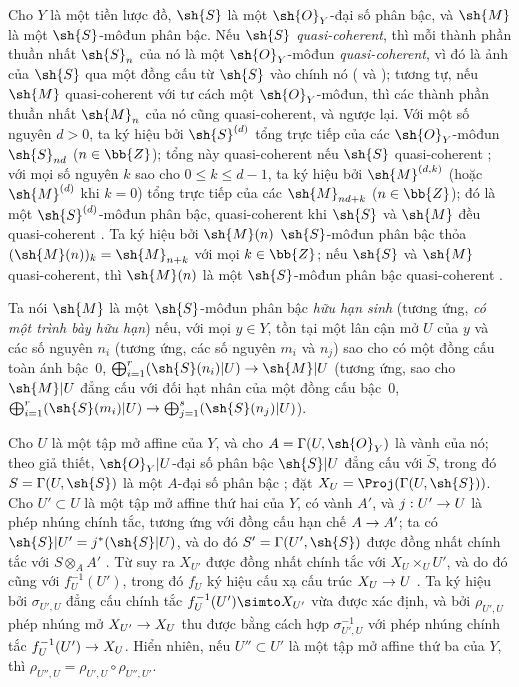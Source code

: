 \documentclass[oneside,10pt]{amsart}
\makeatletter
\renewcommand{\leq}{\leqslant}
\newcommand{\ega@arrow}[2]{\mathchoice{#1}{#2}{#2}{#2}}
\renewcommand{\to}{\ega@arrow{\longrightarrow}{\rightarrow}}
\newcommand{\oldpage}[2][]{\marginnote{\normalfont\footnotesize\textbf{#1}~|~#2}\ignorespaces}
\let\EGAOriginalLabel\label
\renewcommand{\label}[1]{\phantomsection\EGAOriginalLabel{#1}}
\makeatother
\begin{document}
\begin{env}[3.1.1]
\label{II.3.1.1}
Cho $Y$ là một tiền lược đồ, $\sh{S}$ là một $\sh{O}_Y$-đại số phân bậc, và $\sh{M}$ là một $\sh{S}$-môđun phân bậc.
Nếu $\sh{S}$ \emph{quasi-coherent}, thì mỗi thành phần thuần nhất $\sh{S}_n$ của nó là một $\sh{O}_Y$-môđun \emph{quasi-coherent}, vì đó là ảnh của $\sh{S}$ qua một đồng cấu từ $\sh{S}$ vào chính nó ( và );
tương tự, nếu $\sh{M}$ quasi-coherent với tư cách một $\sh{O}_Y$-môđun, thì các thành phần thuần nhất $\sh{M}_n$ của nó cũng quasi-coherent, và ngược lại.
Với một số nguyên $d>0$, ta ký hiệu bởi $\sh{S}^{(d)}$ tổng trực tiếp của các $\sh{O}_Y$-môđun $\sh{S}_{nd}$ ($n\in\bb{Z}$); tổng này quasi-coherent nếu $\sh{S}$ quasi-coherent ;
với mọi số nguyên $k$ sao cho $0\leq k\leq d-1$, ta ký hiệu bởi $\sh{M}^{(d,k)}$ (hoặc $\sh{M}^{(d)}$ khi $k=0$) tổng trực tiếp của các $\sh{M}_{nd+k}$ ($n\in\bb{Z}$); đó là một $\sh{S}^{(d)}$-môđun phân bậc, quasi-coherent khi $\sh{S}$ và $\sh{M}$ đều quasi-coherent .
Ta ký hiệu bởi $\sh{M}(n)$ $\sh{S}$-môđun phân bậc thỏa $(\sh{M}(n))_k=\sh{M}_{n+k}$ với mọi $k\in\bb{Z}$;
nếu $\sh{S}$ và $\sh{M}$ quasi-coherent, thì $\sh{M}(n)$ là một $\sh{S}$-môđun phân bậc quasi-coherent .

Ta nói $\sh{M}$ là một $\sh{S}$-môđun phân bậc \emph{hữu hạn sinh} (tương ứng, \emph{có một trình bày hữu hạn}) nếu, với mọi $y\in Y$, tồn tại một lân cận mở $U$ của $y$ và các số nguyên $n_i$ (tương ứng, các số nguyên $m_i$ và $n_j$) sao cho có một đồng cấu toàn ánh bậc~$0$, $\bigoplus_{i=1}^r(\sh{S}(n_i)|U)\to\sh{M}|U$ (tương ứng, sao cho $\sh{M}|U$ đẳng cấu với đối hạt nhân của một đồng cấu bậc~$0$, $\bigoplus_{i=1}^r(\sh{S}(m_i)|U)\to\bigoplus_{j=1}^s(\sh{S}(n_j)|U)$).

Cho $U$ là một tập mở affine của $Y$, và cho $A=\Gamma(U,\sh{O}_Y)$ là vành của nó;
theo giả thiết, $\sh{O}_Y|U$-đại số phân bậc $\sh{S}|U$ đẳng cấu với $\widetilde{S}$, trong đó $S=\Gamma(U,\sh{S})$ là một $A$-đại số
\oldpage[II]{50}
phân bậc ;
đặt $X_U=\Proj(\Gamma(U,\sh{S}))$.
Cho $U'\subset U$ là một tập mở affine thứ hai của $Y$, có vành $A'$, và $j:U'\to U$ là phép nhúng chính tắc, tương ứng với đồng cấu hạn chế $A\to A'$;
ta có $\sh{S}|U'=j^*(\sh{S}|U)$, và do đó $S'=\Gamma(U',\sh{S})$ được đồng nhất chính tắc với $S\otimes_AA'$ .
Từ  suy ra $X_{U'}$ được đồng nhất chính tắc với $X_U\times_U U'$, và do đó cũng với $f_U^{-1}(U')$, trong đó $f_U$ ký hiệu cấu xạ cấu trúc $X_U\to U$ .
Ta ký hiệu bởi $\sigma_{U',U}$ đẳng cấu chính tắc $f_U^{-1}(U')\simto X_{U'}$ vừa được xác định, và bởi $\rho_{U',U}$ phép nhúng mở $X_{U'}\to X_U$ thu được bằng cách hợp $\sigma_{U',U}^{-1}$ với phép nhúng chính tắc $f_U^{-1}(U')\to X_U$.
Hiển nhiên, nếu $U''\subset U'$ là một tập mở affine thứ ba của $Y$, thì $\rho_{U'',U}=\rho_{U',U}\circ\rho_{U'',U'}$.
\end{env}
\end{document}
